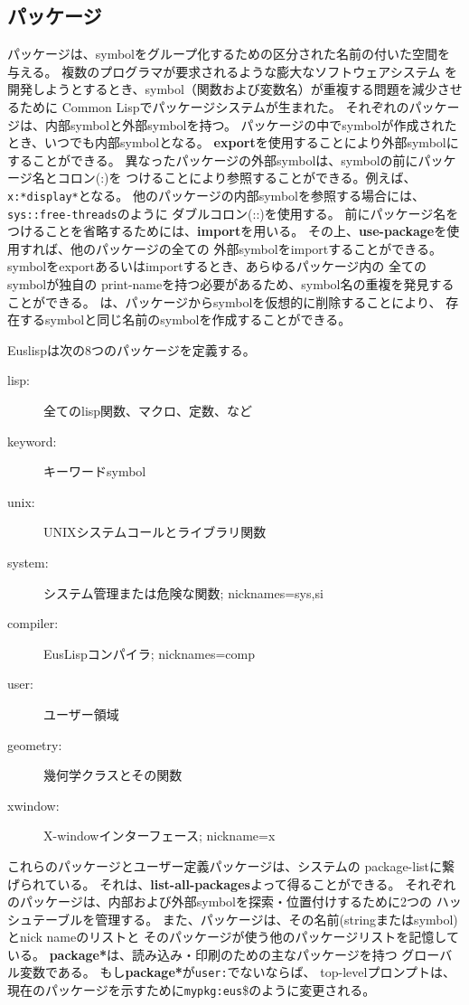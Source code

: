\subsection{パッケージ}

パッケージは、symbolをグループ化するための区分された名前の付いた空間を与える。
複数のプログラマが要求されるような膨大なソフトウェアシステム
を開発しようとするとき、symbol（関数および変数名）が重複する問題を減少させるために
Common Lispでパッケージシステムが生まれた。
それぞれのパッケージは、内部symbolと外部symbolを持つ。
パッケージの中でsymbolが作成されたとき、いつでも内部symbolとなる。
{\bf export}を使用することにより外部symbolにすることができる。
異なったパッケージの外部symbolは、symbolの前にパッケージ名とコロン(:)を
つけることにより参照することができる。例えば、{\tt x:*display*}となる。
他のパッケージの内部symbolを参照する場合には、{\tt sys::free-threads}のように
ダブルコロン(::)を使用する。
前にパッケージ名をつけることを省略するためには、{\bf import}を用いる。
その上、{\bf use-package}を使用すれば、他のパッケージの全ての
外部symbolをimportすることができる。
symbolをexportあるいはimportするとき、あらゆるパッケージ内の
全てのsymbolが独自の
print-nameを持つ必要があるため、symbol名の重複を発見することができる。
は、パッケージからsymbolを仮想的に削除することにより、
存在するsymbolと同じ名前のsymbolを作成することができる。

Euslispは次の8つのパッケージを定義する。
\begin{description}
\item [lisp:] 全てのlisp関数、マクロ、定数、など
\item [keyword:] キーワードsymbol
\item [unix:] UNIXシステムコールとライブラリ関数
\item [system:] システム管理または危険な関数; nicknames=sys,si
\item [compiler:] EusLispコンパイラ; nicknames=comp
\item [user:] ユーザー領域
\item [geometry:] 幾何学クラスとその関数
\item [xwindow:] X-windowインターフェース; nickname=x
\end{description}

これらのパッケージとユーザー定義パッケージは、システムの
package-listに繋げられている。
それは、{\bf list-all-packages}よって得ることができる。
それぞれのパッケージは、内部および外部symbolを探索・位置付けするために2つの
ハッシュテーブルを管理する。
また、パッケージは、その名前(stringまたはsymbol)とnick nameのリストと
そのパッケージが使う他のパッケージリストを記憶している。
{\bf *package*}は、読み込み・印刷のための主なパッケージを持つ
グローバル変数である。
もし{\bf *package*}が{\tt user:}でないならば、
top-levelプロンプトは、現在のパッケージを示すために{\tt mypkg:eus}\$のように変更される。

